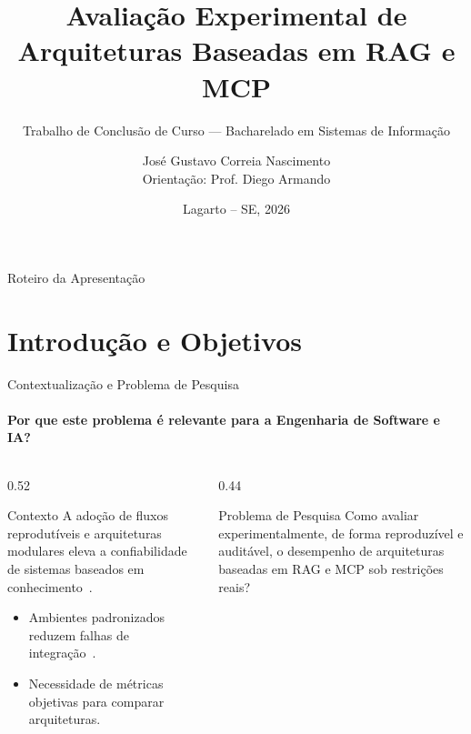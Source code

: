 \documentclass[aspectratio=169, 11pt]{beamer}
\title[RAG e MCP — Defesa de TCC]{Avaliação Experimental de Arquiteturas Baseadas em RAG e MCP}
\subtitle{Trabalho de Conclusão de Curso — Bacharelado em Sistemas de Informação}
\author[José Gustavo C. Nascimento]{José Gustavo Correia Nascimento \\[4pt] {\footnotesize\normalfont Orientação: Prof. Diego Armando}}
\institute{INSTITUTO FEDERAL DE SERGIPE — CAMPUS LAGARTO}
\date{Lagarto -- SE, 2026}
\begin{document}
\begin{frame}[plain]
  \titlepage
\end{frame}

\begin{frame}{Roteiro da Apresentação}
  \tableofcontents
\end{frame}

\section{Introdução e Objetivos}

\begin{frame}{Contextualização e Problema de Pesquisa}
  \framesubtitle{Por que este problema é relevante para a Engenharia de Software e IA?}
  \begin{columns}[T, onlytextwidth]
    \begin{column}{0.52\textwidth}
      \begin{block}{Contexto}
        A adoção de fluxos reprodutíveis e arquiteturas modulares eleva a confiabilidade de sistemas baseados em conhecimento~\cite{exemplo2026}.
      \end{block}
      \vspace{0.25cm}
      \begin{itemize}
        \item Ambientes padronizados reduzem falhas de integração~\cite{devcontainer}.
        \item Necessidade de métricas objetivas para comparar arquiteturas.
      \end{itemize}
    \end{column}
    \begin{column}{0.44\textwidth}
      \begin{alertblock}{Problema de Pesquisa}
        Como avaliar experimentalmente, de forma reproduzível e auditável, o desempenho de arquiteturas baseadas em RAG e MCP sob restrições reais?
      \end{alertblock}
    \end{column}
  \end{columns}
\end{frame}
\end{document}
